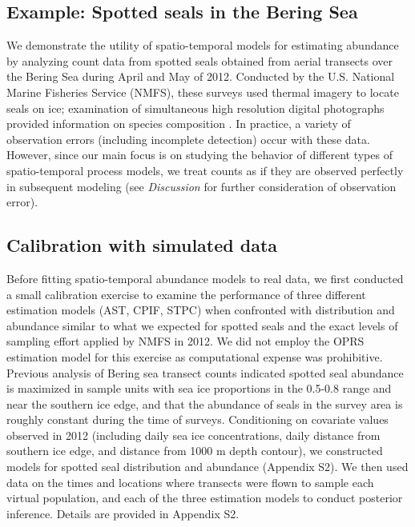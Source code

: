 \documentclass[12pt,english]{article}
\begin{document}
\begin{spacing}{1.9}
\section{Example: Spotted seals in the Bering Sea}

We demonstrate the utility of spatio-temporal models for estimating abundance by analyzing
count data from spotted seals obtained from aerial transects over the Bering Sea during April and May of 2012.  Conducted by the U.S. National Marine Fisheries Service (NMFS), these surveys used thermal imagery to locate seals on ice; examination of simultaneous high resolution digital photographs provided information on species composition \citep[for detailed information on survey methods, see][]{ConnEtAl2014}.  In practice, a variety of observation errors (including incomplete detection) occur with these data.  However, since our main focus is on studying the behavior of different types of spatio-temporal process models, we treat counts as if they are observed perfectly in subsequent modeling (see {\it Discussion} for further consideration of observation error).

\subsection{Calibration with simulated data}

Before fitting spatio-temporal abundance models to real data, we first conducted a small calibration exercise to examine the performance of three different estimation models (AST, CPIF, STPC) when confronted with distribution and abundance similar to what we expected for spotted seals and the exact levels of sampling effort applied by NMFS in 2012.  We did not employ the OPRS estimation model for this exercise as computational expense was prohibitive.  Previous analysis of Bering sea transect counts  \citep{ConnEtAl2014,VerHoefEtAl2014} indicated spotted seal abundance is maximized in sample units with sea ice proportions in the 0.5-0.8 range and near the southern ice edge, and that the abundance of seals in the survey area is roughly constant during the time of surveys.  Conditioning on covariate values observed in 2012 (including daily sea ice concentrations, daily distance from southern ice edge, and distance from 1000 m depth contour), we constructed models for spotted seal distribution and abundance (Appendix S2).  We then used data on the times and locations where transects were flown to sample each virtual population, and each of the three estimation models to conduct posterior inference.  Details are provided in Appendix S2.


\end{spacing}
\end{document}
